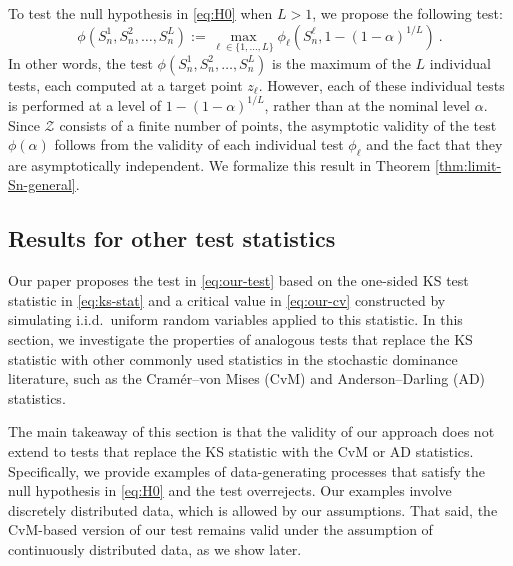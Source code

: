 \documentclass[11pt]{article}
\numberwithin{equation}{section}
\begin{document}
To test the null hypothesis in \eqref{eq:H0} when $L>1$, we propose the following test:
\begin{equation}\label{eq:phi-multiple}
    \phi(S^{1}_n,S^{2}_n,\dots,S^{L}_n) := \max_{\ell \in \{1,\dots,L\}} \phi_{\ell}\left(S^{\ell}_n,1-(1-\alpha)^{1/L}\right)~.
\end{equation}
In other words, the test $\phi(S^{1}_n,S^{2}_n,\dots,S^{L}_n)$ is the maximum of the $L$ individual tests, each computed at a target point $z_{\ell}$. However, each of these individual tests is performed at a level of $1 - (1 - \alpha)^{1/L}$, rather than at the nominal level $\alpha$. Since $\mathcal{Z}$ consists of a finite number of points, the asymptotic validity of the test $\phi(\alpha)$ follows from the validity of each individual test $\phi_{\ell}$ and the fact that they are asymptotically independent. We formalize this result in Theorem \ref{thm:limit-Sn-general}.

\subsection{Results for other test statistics}\label{app:other-stats}

Our paper proposes the test in \eqref{eq:our-test} based on the one-sided KS test statistic in \eqref{eq:ks-stat} and a critical value in \eqref{eq:our-cv} constructed by simulating i.i.d.\ uniform random variables applied to this statistic. In this section, we investigate the properties of analogous tests that replace the KS statistic with other commonly used statistics in the stochastic dominance literature, such as the Cramér--von Mises (CvM) and Anderson--Darling (AD) statistics.

The main takeaway of this section is that the validity of our approach does not extend to tests that replace the KS statistic with the CvM or AD statistics. Specifically, we provide examples of data-generating processes that satisfy the null hypothesis in \eqref{eq:H0} and the test overrejects. Our examples involve discretely distributed data, which is allowed by our assumptions. That said, the CvM-based version of our test remains valid under the assumption of continuously distributed data, as we show later.
\end{document}
